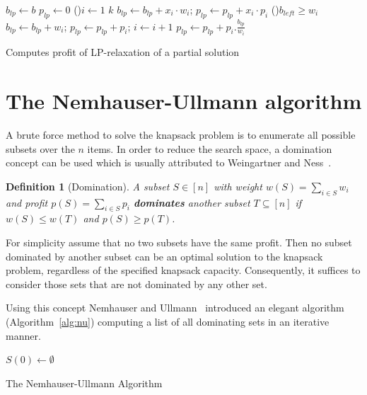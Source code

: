 \documentclass{article}
\newtheorem{mydef}{Definition}
\let\emph\textbf
\begin{document}
\begin{algorithm}[H]
 $b_{lp} \leftarrow b$\;
 $p_{lp} \leftarrow 0$\;
 \For(){$i \leftarrow 1$ \KwTo $k$}{
 	$b_{lp} \leftarrow b_{lp} + x_i \cdot w_i$;
 	$p_{lp} \leftarrow p_{lp} + x_i \cdot p_i$\;
 }
 \While(){$b_{left} \geqslant w_i$}{
 	$b_{lp} \leftarrow b_{lp} + w_i$;
 	$p_{lp} \leftarrow p_{lp} + p_i$;
	$i \leftarrow i+1$\;
 }
 $p_{lp} \leftarrow p_{lp} + p_i.\frac{b_{lp}}{w_i}$
 \caption{Computes profit of LP-relaxation of a partial solution}
 \label{alg:greedy}
\end{algorithm}

\newpage

\section{The Nemhauser-Ullmann algorithm}

A brute force method to solve the knapsack problem is to enumerate all possible subsets over the $n$ items.
In order to reduce the search space, a domination concept can be used which is usually attributed to Weingartner and Ness~\cite{weingartner1967methods}.
\begin{mydef}[Domination]
A subset $S \in [n]$ with weight $w(S) = \sum_{i \in S} w_i$  and profit $p(S) = \sum_{i \in S} p_i$
\emph{dominates} another subset $T \subseteq [n]$ if $w(S) \leqslant w(T)$ and $p(S) \geqslant p(T)$.
\end{mydef}

For simplicity assume that no two subsets have the same profit.
Then no subset dominated by another subset can be an optimal solution to the knapsack problem, regardless of the specified knapsack capacity.
Consequently, it suffices to consider those sets that are not dominated by any other set.

Using this concept Nemhauser and Ullmann~\cite{nemhauser1969discrete} introduced an elegant
algorithm (Algorithm~\ref{alg:nu}) computing a list of all dominating sets in an iterative manner.

\begin{algorithm}[H]
 $S(0) \leftarrow \emptyset $\;
 \caption{The Nemhauser-Ullmann Algorithm}
 \label{alg:nu}
\end{algorithm}
\end{document}
